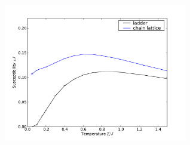 \href{http://alps.comp-phys.org/vistrails/download.php?getvt=10&db=vistrails&host=alps.ethz.ch&port=3306&tag=&execute=True&showspreadsheetonly=True&embedWorkflow=False&version=169}{\includegraphics[width=8cm]{vistrails_images/alps.ethz.ch_vistrails_3306_10_169_pdf/susceptibilities_None.pdf}
}